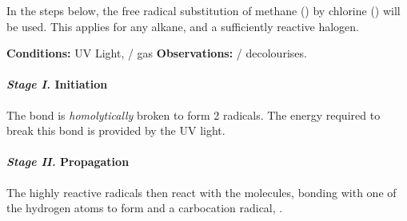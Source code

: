 				In the steps below, the free radical substitution of methane () by chlorine () will be used. This applies
				for any alkane, and a sufficiently reactive halogen.

				\vspace{1.5em}

				\vbox{\textbf{Conditions:}	\tabto{35mm}UV Light,  /  gas}
				\vbox{\textbf{Observations:}\tabto{35mm}  /   decolourises.}

				\paragraph{\textit{Stage I.\protect\hphantom{II}}\hspace{5mm} Initiation}

					The \ch{\chlorine-\chlorine} bond is \textit{homolytically} broken to form 2 \ch{\chlorine} radicals.
					The energy required to break this bond is provided by the UV light.



				\paragraph{\textit{Stage II.\protect\hphantom{I}}\hspace{5mm} Propagation}

					The highly reactive \ch{\chlorine} radicals then react with the  molecules, bonding with one of the
					hydrogen atoms to form  and a carbocation radical, .


